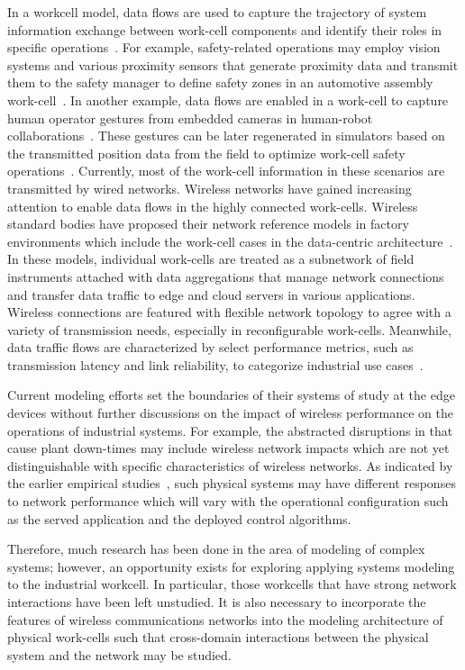 In a workcell model, data flows are used to capture the trajectory of system information exchange between work-cell components and identify their roles in specific operations~\cite{OpenArch}. For example, safety-related operations may employ vision systems and various proximity sensors that generate proximity data and transmit them to the safety manager to define safety zones in an automotive assembly work-cell~\cite{safeeye}. 
In another example, data flows are enabled in a work-cell to capture human operator gestures from embedded cameras in human-robot collaborations~\cite{cobotcell}. These gestures can be later regenerated in simulators based on the transmitted position data from the field to optimize work-cell safety operations~\cite{Duan2009}. Currently, most of the work-cell information in these scenarios are transmitted by wired networks. Wireless networks have gained increasing attention to enable data flows in the highly connected work-cells. Wireless standard bodies have proposed their network reference models in factory environments which include the work-cell cases in the data-centric architecture~\cite{ETSI889, KPItable}. In these models, individual work-cells are treated as a subnetwork of field instruments attached with data aggregations that manage network connections and transfer data traffic to edge and cloud servers in various applications. Wireless connections are featured with flexible network topology to agree with a variety of transmission needs, especially in reconfigurable work-cells. Meanwhile, data traffic flows are characterized by select performance metrics, such as transmission latency and link reliability, to categorize industrial use cases~\cite{KPItable}. 

Current modeling efforts set the boundaries of their systems of study at the edge devices without further discussions on the impact of wireless performance on the operations of industrial systems. For example, the abstracted disruptions in \cite{QChang,Liu2012} that cause plant down-times may include wireless network impacts which are not yet distinguishable with specific characteristics of wireless networks. As indicated by the earlier empirical studies~\cite{Liu2016}, such physical systems may have different responses to network performance which will vary with the operational configuration such as the served application and the deployed control algorithms. 

Therefore, much research has been done in the area of modeling of complex systems; however, an opportunity exists for exploring applying systems modeling to the industrial workcell.  In particular, those workcells that have strong network interactions have been left unstudied.  It is also necessary to incorporate the features of wireless communications networks into the modeling architecture of physical work-cells such that cross-domain interactions between the physical system and the network may be studied.  

